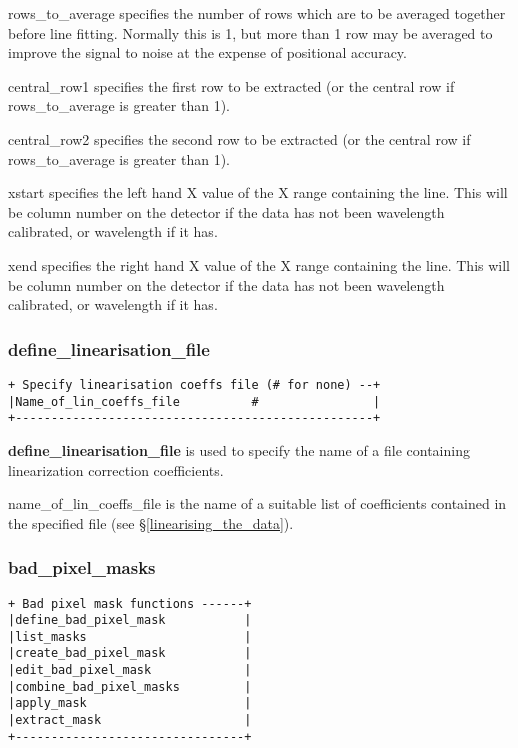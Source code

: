 {{\sf rows\_to\_average} specifies the number of rows which are to be
averaged together before line fitting.
Normally this is 1, but more than 1 row may be averaged to improve the 
signal to noise at the expense of positional accuracy.

{\sf central\_row1} specifies the first row to be extracted (or the 
central row if {\sf rows\_to\_average} is greater than 1).

{\sf central\_row2} specifies the second row to be extracted (or the 
central row if {\sf rows\_to\_average} is greater than 1).

{\sf xstart} specifies the left hand X value of the X range containing 
the line.
This will be column number on the detector if the data has not been 
wavelength calibrated, or wavelength if it has.

{\sf xend} specifies the right hand X value of the X range containing 
the line.
This will be column number on the detector if the data has not been 
wavelength calibrated, or wavelength if it has.

\subsubsection{define\_linearisation\_file} 
\label{define_linearisation_file} 
\begin{verbatim}
+ Specify linearisation coeffs file (# for none) --+
|Name_of_lin_coeffs_file          #                |
+--------------------------------------------------+
\end{verbatim}

{\bf define\_linearisation\_file} is used to specify the name of a
file containing linearization correction coefficients.

{\sf name\_of\_lin\_coeffs\_file} is the name of a suitable list
of coefficients contained in the specified file (see \S \ref{linearising_the_data}).

\subsubsection{bad\_pixel\_masks} 
\label{bad_pixel_masks} 
\begin{verbatim}
+ Bad pixel mask functions ------+
|define_bad_pixel_mask           |
|list_masks                      |
|create_bad_pixel_mask           |
|edit_bad_pixel_mask             |
|combine_bad_pixel_masks         |
|apply_mask                      |
|extract_mask                    |
+--------------------------------+
\end{verbatim}

}
